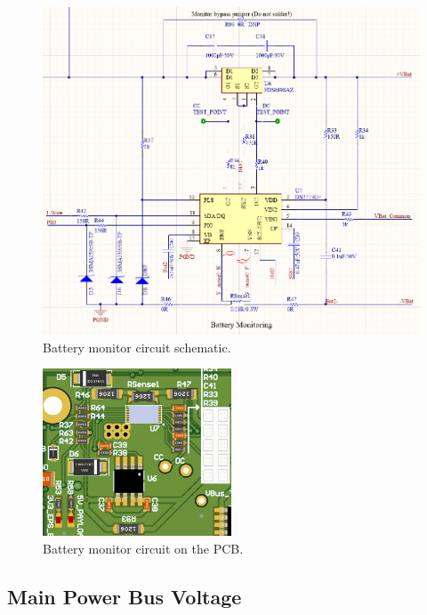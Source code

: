 \begin{figure}[!ht]
    \begin{center}
        \includegraphics[width=\textwidth]{figures/bms-circuit-schematic.png}
        \caption{Battery monitor circuit schematic.}
        \label{fig:bms-circuit-schematic}
    \end{center}
\end{figure}

\begin{figure}[!ht]
    \begin{center}
        \includegraphics[width=0.5\textwidth]{figures/bms-circuit-3d.png}
        \caption{Battery monitor circuit on the PCB.}
        \label{fig:bms-circuit-3d}
    \end{center}
\end{figure}

\subsection{Main Power Bus Voltage}

